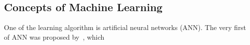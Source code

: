 \subsection{Concepts of Machine Learning}
One of the learning algorithm is artificial neural networks (ANN). The very first of ANN was proposed by~\citet{McCulloch_1943}, which 